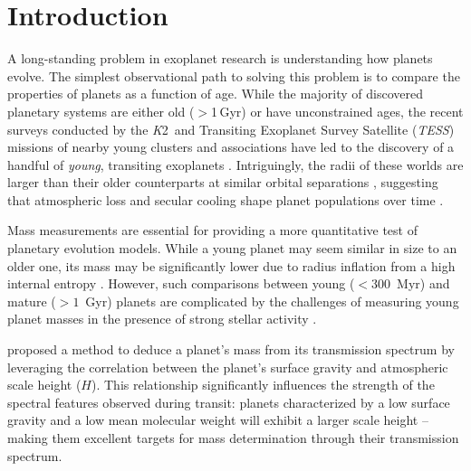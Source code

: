 \documentclass[twocolumn]{aastex63} %
\newcommand{\tess}{\textit{TESS}}
\newcommand{\ktwo}{{\textit K2}}
\begin{document}

\section{Introduction}\label{sec:intro}

A long-standing problem in exoplanet research is understanding how planets evolve. The simplest observational path to solving this problem is to compare the properties of planets as a function of age. While the majority of discovered planetary systems are either old ($>$1\,Gyr) or have unconstrained ages, the recent surveys conducted by the \ktwo\ and Transiting Exoplanet Survey Satellite (\tess) missions of nearby young clusters and associations have led to the discovery of a handful of \textit{young}, transiting exoplanets \citep[e.g.][]{bouma2020cluster, 2020MNRAS.498.5972N, Bouma2022, wood23}. Intriguingly, the radii of these worlds are larger than their older counterparts at similar orbital separations \citep{Vach2024}, suggesting that atmospheric loss and secular cooling shape planet populations over time \citep{owen2017evaporation}. 

Mass measurements are essential for providing a more quantitative test of planetary evolution models. While a young planet may seem similar in size to an older one, its mass may be significantly lower due to radius inflation from a high internal entropy \citep{Lopez2014}. However, such comparisons between young ($< 300$~Myr) and mature ($> 1$~Gyr) planets are complicated by the challenges of measuring young planet masses in the presence of strong stellar activity \citep{blunt2023overfitting, tran2021epoch}. 


\citet{dewit13} proposed a method to deduce a planet's mass from its transmission spectrum by leveraging the correlation between the planet's surface gravity and atmospheric scale height ($H$). This relationship significantly influences the strength of the spectral features observed during transit: planets characterized by a low surface gravity and a low mean molecular weight will exhibit a larger scale height -- making them excellent targets for mass determination through their transmission spectrum. 
\end{document}
